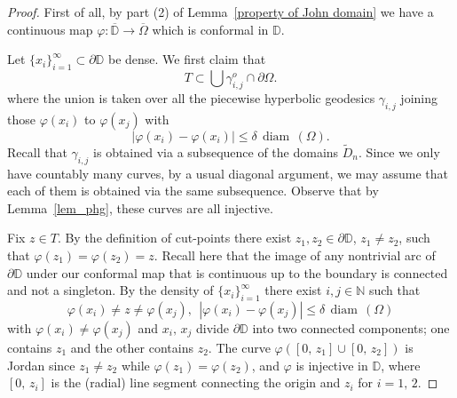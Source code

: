\documentclass[reqno,11pt]{amsart}
\def\nn{{\mathbb N}}
\def\wz{\widetilde}
\def\diam{{\mathop\mathrm{\,diam\,}}}
\numberwithin{equation}{section}
\theoremstyle{remark}
\begin{document}
\begin{proof}
 First of all, by part (2) of Lemma~\ref{property of John domain} we have a continuous 
map $\varphi\colon \overline{\mathbb D} \to \overline{\Omega}$ which is 
conformal in $\mathbb D$.
 

Let $\{x_i\}_{i=1}^\infty \subset \partial \mathbb D$ be dense. 
We first claim that 
\begin{equation}\label{inclusion 1}
  T \subset \bigcup  \gamma_{i,j}^o \cap \partial\Omega. 
\end{equation}
 where the union is taken over all the piecewise hyperbolic geodesics $\gamma_{i,j}$  joining those 
$\varphi(x_i)$ to $\varphi(x_j)$ with $$| \varphi(x_i) - \varphi(x_i)|\le \delta \diam(\Omega).$$ Recall that $\gamma_{i,j}$ is obtained via
a subsequence of the domains $\wz D_n.$
Since we only have countably many curves, by a usual diagonal argument,
we may assume that each of them is obtained via the same subsequence.
Observe that by Lemma~\ref{lem_phg}, these curves are all injective. 


Fix $z \in T$. By the definition of cut-points there 
exist $z_1,z_2 \in \partial \mathbb D$, $z_1 \ne z_2$,
 such that $\varphi(z_1) = \varphi(z_2) = z$.  Recall here that the image
of any nontrivial arc of $\partial \mathbb D$ under our conformal map
that is continuous up to the boundary is connected and not a singleton. By the density of 
$\{x_i\}_{i=1}^\infty$
 there exist $i,j \in \nn$ such that 
 $$\varphi(x_i) \ne z \ne \varphi(x_j),\ \ | \varphi(x_i) - \varphi(x_j)|\le \delta \diam(\Omega)$$
with $\varphi(x_i)\neq \varphi(x_j)$ and $x_i,\,x_j$ divide $\partial \mathbb D$ into two connected components; 
one contains $z_1$ and the other contains $z_2$.
The curve 
$\varphi([0,\,z_1]\cup[0,\,z_2])$ is Jordan since $z_1\neq z_2$ while $\varphi(z_1)=\varphi(z_2)$, and $\varphi$ is injective in $\mathbb D$, where $[0,\,z_i]$ is the 
(radial) line segment connecting the origin and $z_i$ for $i=1,\,2$. 


\end{proof}
\end{document}
